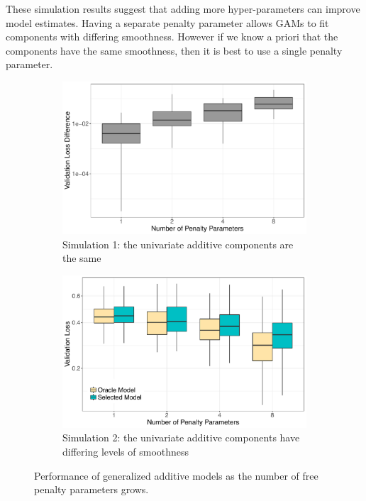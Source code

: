\documentclass[12pt]{article} %
\theoremstyle{definition}
\begin{document}
These simulation results suggest that adding more hyper-parameters can improve model estimates.
Having a separate penalty parameter allows GAMs to fit components with differing smoothness.
However if we know a priori that the components have the same smoothness, then it is best to use a single penalty parameter.

\begin{figure}
	\centering
	\begin{subfigure}{0.6\textwidth}
		\includegraphics[width=\textwidth]{../../../R/figures/validation_size_loss_diff_homogeneous.pdf}
		\caption{Simulation 1: the univariate additive components are the same}
	\end{subfigure}
	\begin{subfigure}{0.6\textwidth}
		\includegraphics[width=\textwidth]{../../../R/figures/validation_size_loss_heterogeneous_final.pdf}
		\caption{Simulation 2: the univariate additive components have differing levels of smoothness}
	\end{subfigure}
	\caption{
		Performance of generalized additive models as the number of free penalty parameters grows.
	}
	\label{fig:simulations}
\end{figure}
\end{document}
